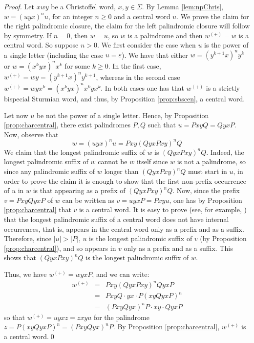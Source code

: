 \documentclass{llncs}
\renewcommand{\epsilon}{\varepsilon}
\begin{document}
\begin{proof}
 Let $xwy$ be a Christoffel word, $x,y\in \Sigma$.  By Lemma \ref{lem:npChris}, $w=(uyx)^{n}u$, for an integer $n\ge 0$ and a central word $u$. We prove the claim for the right palindromic closure, the claim for the left palindromic closure will follow by symmetry. If $n=0$, then $w=u$, so $w$ is a palindrome and then $w^{(+)}=w$ is a central word. So suppose $n>0$. We first consider the case when $u$ is the power of a single letter (including the case $u=\epsilon$). We have that either $w=(y^{k+1}x)^{n}y^{k}$ or $w=(x^{k}yx)^{n}x^{k}$ for some $k\ge 0$. In the first case, $w^{(+)}=wy=(y^{k+1}x)^{n}y^{k+1}$, whereas in the second case $w^{(+)}=wyx^{k}=(x^{k}yx)^{n}x^{k}yx^{k}$. In both cases one has that $w^{(+)}$ is a strictly bispecial Sturmian word, and thus, by Proposition \ref{prop:sbscen}, a central word.

Let now $u$ be not the power of a single letter. Hence, by Proposition \ref{prop:charcentral}, there exist palindromes $P,Q$ such that $u=PxyQ=QyxP$. Now, observe that 
\[
 w  =  (uyx)^{n}u
   =  Pxy(QyxPxy)^{n}Q
\]
We claim that the longest palindromic suffix of $w$ is $(QyxPxy)^{n}Q$. Indeed, the longest palindromic suffix of $w$ cannot be $w$ itself since $w$ is not a palindrome, so since any  palindromic suffix of $w$ longer than $(QyxPxy)^{n}Q$ must start in $u$, in order to prove the claim it is enough to show that the first non-prefix occurrence of $u$ in $w$ is that appearing as a prefix of $(QyxPxy)^{n}Q$. Now, since the prefix $v=PxyQyxP$ of $w$ can be written as $v=uyxP=Pxyu$, one has by Proposition \ref{prop:charcentral} that $v$ is a central word. It is easy to prove (see, for example, \cite{BuDelFi12}) that the longest palindromic suffix of a central word does not have internal occurrences, that is, appears in the central word only as a prefix and as a suffix. Therefore, since $|u|>|P|$, $u$ is the longest palindromic suffix of $v$ (by Proposition \ref{prop:charcentral}), and so appears in $v$ only as a prefix and as a suffix. This shows that $(QyxPxy)^{n}Q$ is the longest palindromic suffix of $w$.

Thus, we have $w^{(+)}=wyxP$, and we can write: 
\begin{eqnarray*}
 w^{(+)} & = & Pxy(QyxPxy)^{n}QyxP\\
 & = & PxyQ \cdot yx \cdot P(xyQyxP)^{n}\\
 & = & (PxyQyx)^{n}P \cdot xy \cdot QyxP
\end{eqnarray*}
so that $w^{(+)}=uyxz=zxyu$ for the palindrome $z=P(xyQyxP)^{n}=(PxyQyx)^{n}P$. By Proposition \ref{prop:charcentral}, $w^{(+)}$ is a central word.\qed
\end{proof}
\end{document}
